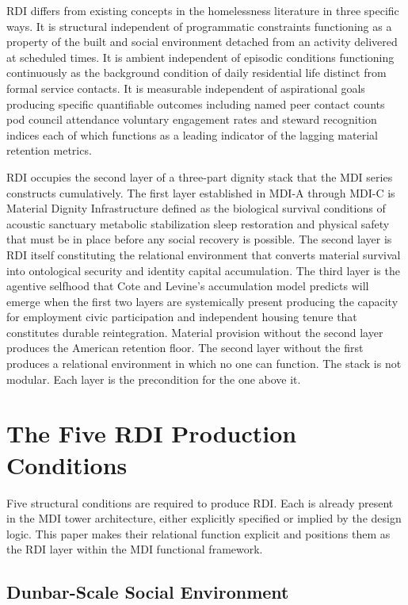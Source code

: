 \documentclass[12pt, letterpaper]{article}
\begin{document}
RDI differs from existing concepts in the homelessness literature in three specific ways. It is structural independent of programmatic constraints functioning as a property of the built and social environment detached from an activity delivered at scheduled times. It is ambient independent of episodic conditions functioning continuously as the background condition of daily residential life distinct from formal service contacts. It is measurable independent of aspirational goals producing specific quantifiable outcomes including named peer contact counts pod council attendance voluntary engagement rates and steward recognition indices each of which functions as a leading indicator of the lagging material retention metrics.

RDI occupies the second layer of a three-part dignity stack that the MDI series constructs cumulatively. The first layer established in MDI-A through MDI-C is Material Dignity Infrastructure defined as the biological survival conditions of acoustic sanctuary metabolic stabilization sleep restoration and physical safety that must be in place before any social recovery is possible. The second layer is RDI itself constituting the relational environment that converts material survival into ontological security and identity capital accumulation. The third layer is the agentive selfhood that Cote and Levine's accumulation model \citep{cote_levine_2002} predicts will emerge when the first two layers are systemically present producing the capacity for employment civic participation and independent housing tenure that constitutes durable reintegration. Material provision without the second layer produces the American retention floor. The second layer without the first produces a relational environment in which no one can function. The stack is not modular. Each layer is the precondition for the one above it.

\clearpage
\section{The Five RDI Production Conditions}

Five structural conditions are required to produce RDI. Each is already present in the MDI tower architecture, either explicitly specified or implied by the design logic. This paper makes their relational function explicit and positions them as the RDI layer within the MDI functional framework.

\subsection{Dunbar-Scale Social Environment}
\end{document}
